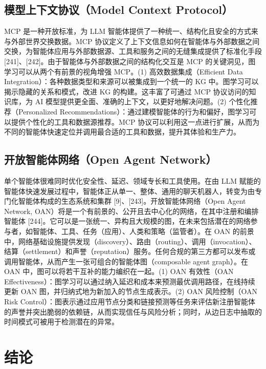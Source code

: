 \documentclass[10pt,UTF8,fontset=fandol]{ctexart}
\begin{document}
\subsection{模型上下文协议（Model Context Protocol）}

MCP 是一种开放标准，为 LLM 智能体提供了一种统一、结构化且安全的方式来与外部世界交换数据。MCP 协议定义了上下文信息如何在智能体与外部数据之间交换，为智能体应用与外部数据源、工具和服务之间的无缝集成提供了标准化手段 [241]、[242]。由于智能体与外部数据之间的结构化交互是 MCP 的关键洞见，图学习可以从两个有前景的视角增强 MCP。(1) 高效数据集成（Efficient Data Integration）：各种数据类型和来源可以被集成到一个统一的 KG 中。图学习可以揭示隐藏的关系和模式，改进 KG 的构建。这丰富了可通过 MCP 协议访问的知识库，为 AI 模型提供更全面、准确的上下文，以更好地解决问题。(2) 个性化推荐（Personalized Recommendations）：通过建模智能体的行为和偏好，图学习可以提供个性化的工具和数据源推荐。MCP 协议可以利用这一点进行扩展，从而为不同的智能体快速定位并调用最合适的工具和数据，提升其体验和生产力。

\subsection{开放智能体网络（Open Agent Network）}

单个智能体很难同时优化安全性、延迟、领域专长和工具使用。在由 LLM 赋能的智能体快速发展过程中，智能体正从单一、整体、通用的聊天机器人，转变为由专门化智能体构成的生态系统和集群 [9]、[243]。开放智能体网络（Open Agent Network, OAN）将是一个有前景的、公开且去中心化的网络，在其中注册和编排智能体 [244]。它可以是一张统一、异构且大规模的图，在未来包括潜在的网络参与者，如智能体、工具、任务（应用）、人类和策略（监管者）。在 OAN 的前景中，网络基础设施提供发现（discovery）、路由（routing）、调用（invocation）、结算（settlement）和声誉（reputation）服务。任何合规的第三方都可以发布或调用智能体，从而产生一张可组合的智能体图（composable agent graph）。在 OAN 中，图可以将若干互补的能力编织在一起。(1) OAN 有效性（OAN Effectiveness）：图学习可以通过纳入延迟和成本来预测最优调用路径，在线持续更新 OAN 图，并归纳式地为新加入的节点生成表示。(2) OAN 风险控制（OAN Risk Control）：图表示通过应用节点分类和链接预测等任务来评估新注册智能体的声誉并突出脆弱的依赖链，从而实现信任与风险分析；同时，从边日志中抽取的时间模式可被用于检测潜在的异常。

\section{结论}
\end{document}
